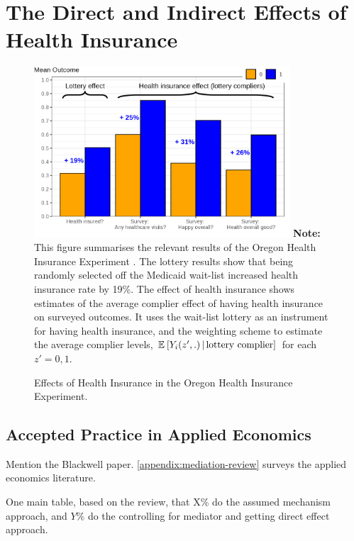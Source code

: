 \section{The Direct and Indirect Effects of Health Insurance}
\label{sec:healthinsurance}


\begin{figure}[h!]
    \caption{Effects of Health Insurance in the Oregon Health Insurance Experiment.}
    \centering
    \includegraphics[width=0.85\textwidth]{sections/figures/insurance-effects.png}
    \label{fig:healthinsurance-effects}
    \justify
    \footnotesize    
    \textbf{Note:}
    This figure summarises the relevant results of the Oregon Health Insurance Experiment \citep{finkelstein2008oregon}.
    The lottery results show that being randomly selected off the Medicaid wait-list increased health insurance rate by 19\%.
    The effect of health insurance shows estimates of the average complier effect of having health insurance on surveyed outcomes.
    It uses the wait-list lottery as an instrument for having health insurance, and the \cite{abadie2003semiparametric} weighting scheme to estimate the average complier levels, $\mathbb{E}_{} \left[ Y_i(z',.) \, \middle\vert \, \text{lottery complier} \right]$ for each $z'=0,1$.
\end{figure}


\subsection{Accepted Practice in Applied Economics}

Mention the Blackwell paper.
\autoref{appendix:mediation-review} surveys the applied economics literature.

One main table, based on the \cite{garg2025causalclaimseconomics} review, that X\% do the assumed mechanism approach, and $Y\%$ do the controlling for mediator and getting direct effect approach.

